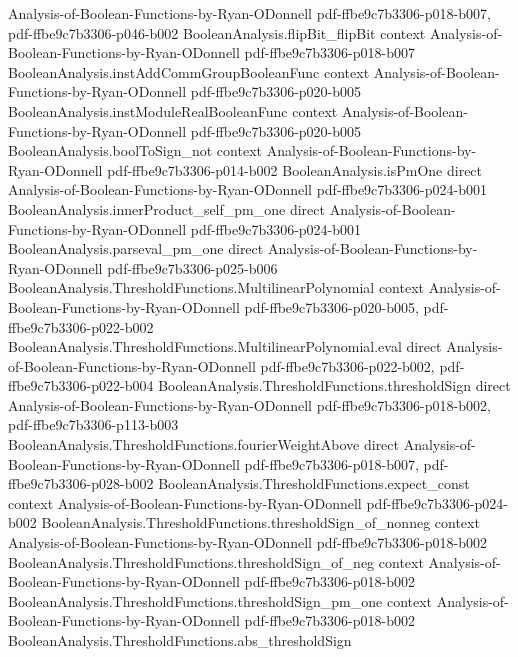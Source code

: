 \begin{lemma}
  {Analysis-of-Boolean-Functions-by-Ryan-ODonnell}
  {pdf-ffbe9c7b3306-p018-b007,
    pdf-ffbe9c7b3306-p046-b002}
\proofstep
  {BooleanAnalysis.flipBit_flipBit}
  {context}
  {Analysis-of-Boolean-Functions-by-Ryan-ODonnell}
  {pdf-ffbe9c7b3306-p018-b007}
\proofstep
  {BooleanAnalysis.instAddCommGroupBooleanFunc}
  {context}
  {Analysis-of-Boolean-Functions-by-Ryan-ODonnell}
  {pdf-ffbe9c7b3306-p020-b005}
\proofstep
  {BooleanAnalysis.instModuleRealBooleanFunc}
  {context}
  {Analysis-of-Boolean-Functions-by-Ryan-ODonnell}
  {pdf-ffbe9c7b3306-p020-b005}
\proofstep
  {BooleanAnalysis.boolToSign_not}
  {context}
  {Analysis-of-Boolean-Functions-by-Ryan-ODonnell}
  {pdf-ffbe9c7b3306-p014-b002}
\proofstep
  {BooleanAnalysis.isPmOne}
  {direct}
  {Analysis-of-Boolean-Functions-by-Ryan-ODonnell}
  {pdf-ffbe9c7b3306-p024-b001}
\proofstep
  {BooleanAnalysis.innerProduct_self_pm_one}
  {direct}
  {Analysis-of-Boolean-Functions-by-Ryan-ODonnell}
  {pdf-ffbe9c7b3306-p024-b001}
\proofstep
  {BooleanAnalysis.parseval_pm_one}
  {direct}
  {Analysis-of-Boolean-Functions-by-Ryan-ODonnell}
  {pdf-ffbe9c7b3306-p025-b006}
\proofstep
  {BooleanAnalysis.ThresholdFunctions.MultilinearPolynomial}
  {context}
  {Analysis-of-Boolean-Functions-by-Ryan-ODonnell}
  {pdf-ffbe9c7b3306-p020-b005,
    pdf-ffbe9c7b3306-p022-b002}
\proofstep
  {BooleanAnalysis.ThresholdFunctions.MultilinearPolynomial.eval}
  {direct}
  {Analysis-of-Boolean-Functions-by-Ryan-ODonnell}
  {pdf-ffbe9c7b3306-p022-b002,
    pdf-ffbe9c7b3306-p022-b004}
\proofstep
  {BooleanAnalysis.ThresholdFunctions.thresholdSign}
  {direct}
  {Analysis-of-Boolean-Functions-by-Ryan-ODonnell}
  {pdf-ffbe9c7b3306-p018-b002,
    pdf-ffbe9c7b3306-p113-b003}
\proofstep
  {BooleanAnalysis.ThresholdFunctions.fourierWeightAbove}
  {direct}
  {Analysis-of-Boolean-Functions-by-Ryan-ODonnell}
  {pdf-ffbe9c7b3306-p018-b007,
    pdf-ffbe9c7b3306-p028-b002}
\proofstep
  {BooleanAnalysis.ThresholdFunctions.expect_const}
  {context}
  {Analysis-of-Boolean-Functions-by-Ryan-ODonnell}
  {pdf-ffbe9c7b3306-p024-b002}
\proofstep
  {BooleanAnalysis.ThresholdFunctions.thresholdSign_of_nonneg}
  {context}
  {Analysis-of-Boolean-Functions-by-Ryan-ODonnell}
  {pdf-ffbe9c7b3306-p018-b002}
\proofstep
  {BooleanAnalysis.ThresholdFunctions.thresholdSign_of_neg}
  {context}
  {Analysis-of-Boolean-Functions-by-Ryan-ODonnell}
  {pdf-ffbe9c7b3306-p018-b002}
\proofstep
  {BooleanAnalysis.ThresholdFunctions.thresholdSign_pm_one}
  {context}
  {Analysis-of-Boolean-Functions-by-Ryan-ODonnell}
  {pdf-ffbe9c7b3306-p018-b002}
\proofstep
  {BooleanAnalysis.ThresholdFunctions.abs_thresholdSign}

\end{lemma}
